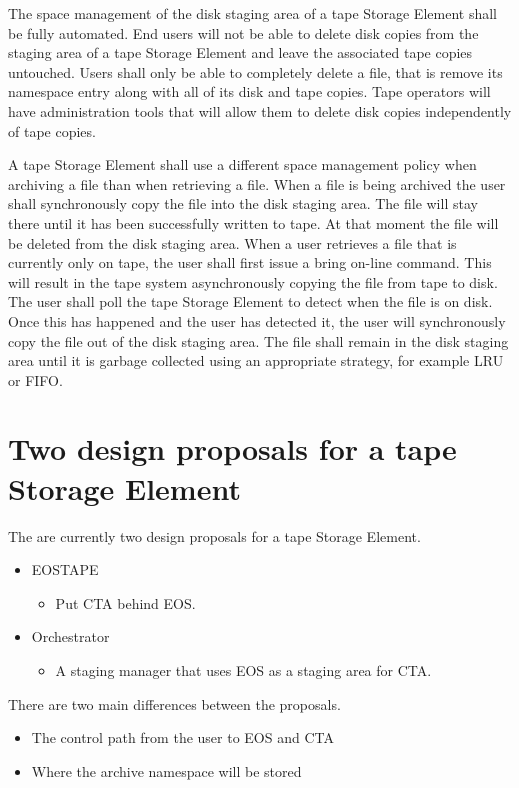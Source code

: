 \documentclass{article}
\begin{document}
The space management of the disk staging area of a tape Storage Element shall be fully automated.  End users will not be able to delete disk copies from the staging area of a tape Storage Element and leave the associated tape copies untouched.  Users shall only be able to completely delete a file, that is remove its namespace entry along with all of its disk and tape copies.  Tape operators will have administration tools that will allow them to delete disk copies independently of tape copies. 

A tape Storage Element shall use a different space management policy when archiving a file than when retrieving a file.  When a file is being archived the user shall synchronously copy the file into the disk staging area.  The file will stay there until it has been successfully written to tape.  At that moment the file will be deleted from the disk staging area.  When a user retrieves a file that is currently only on tape, the user shall first issue a bring on-line command.  This will result in the tape system asynchronously copying the file from tape to disk.  The user shall poll the tape Storage Element to detect when the file is on disk.  Once this has happened and the user has detected it, the user will synchronously copy the file out of the disk staging area.  The file shall remain in the disk staging area until it is garbage collected using an appropriate strategy, for example LRU or FIFO.

\newpage
\section{Two design proposals for a tape Storage Element}

The are currently two design proposals for a tape Storage Element.

\begin{itemize}
	\item EOSTAPE
	\begin{itemize}
		\item Put CTA behind EOS.
	\end{itemize}
	\item Orchestrator
	\begin{itemize}
		\item A staging manager that uses EOS as a staging area for CTA.
	\end{itemize}
\end{itemize}

There are two main differences between the proposals.
\begin{itemize}
	\item The control path from the user to EOS and CTA
	\item Where the archive namespace will be stored
\end{itemize}
\end{document}
